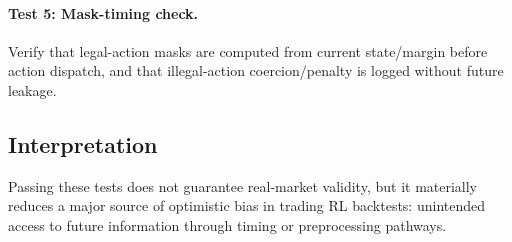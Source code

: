 \paragraph{Test 5: Mask-timing check.}
Verify that legal-action masks are computed from current state/margin before action dispatch, and that illegal-action coercion/penalty is logged without future leakage.

\subsection{Interpretation}
Passing these tests does not guarantee real-market validity, but it materially reduces a major source of optimistic bias in trading RL backtests: unintended access to future information through timing or preprocessing pathways.
